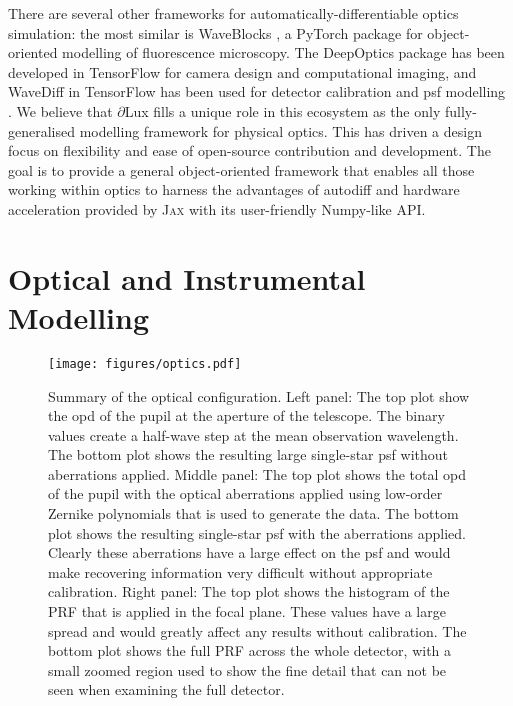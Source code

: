 \documentclass[]{spieman}
\newcommand\jax{\textsc{Jax}\xspace}
\newcommand\dlux{$\partial$Lux\xspace}
\begin{document}
There are several other frameworks for automatically-differentiable optics simulation:
the most similar is WaveBlocks \cite{page2020}, a PyTorch package for object-oriented modelling of fluorescence microscopy. 
The DeepOptics package \cite{sitzmann2018} has been developed in TensorFlow for camera design and computational imaging, and
WaveDiff in TensorFlow has been used for detector calibration \cite{liaudat2021} and \ac{psf} modelling \cite{Liaudat2022}. 
We believe that \dlux fills a unique role in this ecosystem as the only fully-generalised modelling framework for physical optics. This has driven a design focus on flexibility and ease of open-source contribution and development. The goal is to provide a general object-oriented framework that enables all those working within optics to harness the advantages of autodiff and hardware acceleration provided by \jax with its user-friendly Numpy-like API.






\section{Optical and Instrumental Modelling}
\label{sec:simulation}

\begin{figure*}
    \centering
    \texttt{[image: figures/optics.pdf]}
    \caption{Summary of the optical configuration. Left panel: The top plot show the \ac{opd} of the pupil at the aperture of the telescope. The binary values create a half-wave step at the mean observation wavelength. The bottom plot shows the resulting large single-star \ac{psf} without aberrations applied. Middle panel: The top plot shows the total \ac{opd} of the pupil with the optical aberrations applied using low-order Zernike polynomials that is used to generate the data. The bottom plot shows the resulting single-star \ac{psf} with the aberrations applied. Clearly these aberrations have a large effect on the \ac{psf} and would make recovering information very difficult without appropriate calibration. Right panel: The top plot shows the histogram of the PRF that is applied in the focal plane. These values have a large spread and would greatly affect any results without calibration. The bottom plot shows the full PRF across the whole detector, with a small zoomed region used to show the fine detail that can not be seen when examining the full detector.}
    \label{fig:optics}
\end{figure*}
\end{document}
